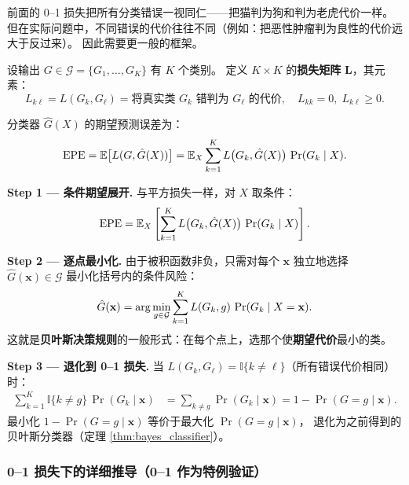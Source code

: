 前面的 0--1 损失把所有分类错误一视同仁——把猫判为狗和判为老虎代价一样。
但在实际问题中，不同错误的代价往往不同（例如：把恶性肿瘤判为良性的代价远大于反过来）。
因此需要更一般的框架。

\begin{definition}
设输出 $G \in \mathcal{G} = \{G_1, \dots, G_K\}$ 有 $K$ 个类别。
定义 $K \times K$ 的\textbf{损失矩阵} $\mathbf{L}$，其元素：
\[
L_{k\ell} = L(G_k, G_\ell) = \text{将真实类 $G_k$ 错判为 $G_\ell$ 的代价},
\quad L_{kk} = 0,\; L_{k\ell} \ge 0.
\]

分类器 $\hat{G}(X)$ 的期望预测误差为：
\begin{equation}\label{eq:epe_general}
    \mathrm{EPE} = \mathbb{E}\big[L(G, \hat{G}(X))\big]
    = \mathbb{E}_X \sum_{k=1}^{K} L\big(G_k, \hat{G}(X)\big) \,\Pr(G_k \mid X).
\end{equation}
\end{definition}

\textbf{Step 1 --- 条件期望展开.}
与平方损失一样，对 $X$ 取条件：
\begin{equation}\label{eq:epe_general_step1}
    \mathrm{EPE} = \mathbb{E}_X \left[ \sum_{k=1}^{K} L\big(G_k, \hat{G}(X)\big) \,\Pr(G_k \mid X) \right].
\end{equation}

\textbf{Step 2 --- 逐点最小化.}
由于被积函数非负，只需对每个 $\mathbf{x}$ 独立地选择 $\hat{G}(\mathbf{x}) \in \mathcal{G}$ 最小化括号内的条件风险：
\begin{equation}\label{eq:epe_pointwise_general}
    \hat{G}(\mathbf{x}) = \arg\min_{g \in \mathcal{G}} \sum_{k=1}^{K} L(G_k, g) \,\Pr(G_k \mid X = \mathbf{x}).
\end{equation}
这就是\textbf{贝叶斯决策规则}的一般形式：在每个点上，选那个使\textbf{期望代价}最小的类。

\textbf{Step 3 --- 退化到 0--1 损失.}
当 $L(G_k, G_\ell) = \mathbb{I}\{k \neq \ell\}$（所有错误代价相同）时：
\begin{align*}
    \sum_{k=1}^{K} \mathbb{I}\{k \neq g\} \,\Pr(G_k \mid \mathbf{x})
    &= \sum_{k \neq g} \Pr(G_k \mid \mathbf{x})
    = 1 - \Pr(G = g \mid \mathbf{x}).
\end{align*}
最小化 $1 - \Pr(G = g \mid \mathbf{x})$ 等价于最大化 $\Pr(G = g \mid \mathbf{x})$，
退化为之前得到的贝叶斯分类器（定理 \ref{thm:bayes_classifier}）。




\subsubsection{0--1 损失下的详细推导（0--1 作为特例验证）}


